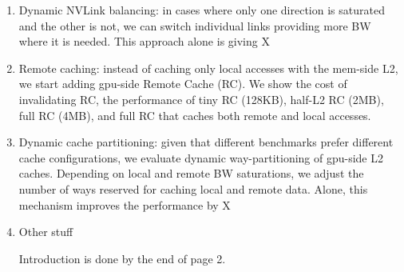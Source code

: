 \begin{enumerate}
\item
Dynamic NVLink balancing: in cases where only one direction is saturated and the other is not, we can switch individual links providing more BW where it is needed. This approach alone is giving X%

\item
Remote caching: instead of caching only local accesses with the mem-side L2, we start adding gpu-side Remote Cache (RC). We show the cost of invalidating RC, the performance of tiny RC (128KB), half-L2 RC (2MB), full RC (4MB), and full RC that caches both remote and local accesses. 

\item
Dynamic cache partitioning: given that different benchmarks prefer different cache configurations, we evaluate dynamic way-partitioning of gpu-side L2 caches. Depending on local and remote BW saturations, we adjust the number of ways reserved for caching local and remote data. Alone, this mechanism improves the performance by X%

\item
Other stuff

\vspace{12in}
Introduction is done by the end of page 2.




\end{enumerate}
